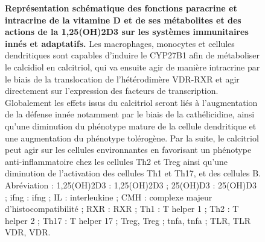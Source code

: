 \documentclass[
  a4paper,
  DIV=11,
  numbers=noendperiod,
  listof=totoc]{scrreprt}
\begin{document}
\begin{figure}


\caption[Représentation schématique des fonctions paracrine et
intracrine de la vitamine D et de ses métabolites et des actions de la
\ac{1,25(OH)2D3} sur les systèmes immunitaires innés et
adaptatifs.]{\label{fig-vd-action}\textbf{Représentation schématique des
fonctions paracrine et intracrine de la vitamine D et de ses métabolites
et des actions de la \ac{1,25(OH)2D3} sur les systèmes immunitaires
innés et adaptatifs.} Les macrophages, monocytes et cellules
dendritiques sont capables d'induire le \ac{CYP27B1} afin de métaboliser
le calcidiol en calcitriol, qui va ensuite agir de manière intracrine
par le biais de la translocation de l'hétérodimère \ac{VDR}-\ac{RXR} et
agir directement sur l'expression des facteurs de transcription.
Globalement les effets issus du calcitriol seront liés à l'augmentation
de la défense innée notamment par le biais de la cathélicidine, ainsi
qu'une diminution du phénotype mature de la cellule dendritique et une
augmentation du phénotype tolérogène. Par la suite, le calcitriol peut
agir sur les cellules environnantes en favorisant un phénotype
anti-inflammatoire chez les cellules \ac{Th2} et \ac{Treg} ainsi qu'une
diminution de l'activation des cellules \ac{Th1} et \ac{Th17}, et des
cellules B. Abréviation : \ac{1,25(OH)2D3} : \acl{1,25(OH)2D3} ;
\ac{25(OH)D3} : \acl{25(OH)D3} ; \ac{ifng} : \acl{ifng} ; IL :
interleukine ; CMH : complexe majeur d'histocompatibilité ; RXR :
\acl{RXR} ; Th1 : T helper 1 ; Th2 : T helper 2 ; Th17 : T helper 17 ;
\ac{Treg}, \acl{Treg} ; \ac{tnfa}, \acl{tnfa} ; \ac{TLR}, \acl{TLR}
\ac{VDR}, \acl{VDR}. \autocite{Charoenngam.2020}}

\end{figure}%
\end{document}
